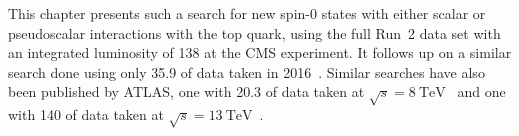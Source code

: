 



This chapter presents such a search for new spin-0 states with either scalar or pseudoscalar interactions with the top quark, using the full Run~2 data set with an integrated luminosity of \SI{138}{\fbinv} at the CMS experiment. It follows up on a similar search done using only \SI{35.9}{\fbinv} of data taken in 2016~\cite{CMS:HIG-17-027}. Similar searches have also been published by ATLAS, one with \SI{20.3}{\fbinv} of data taken at $\sqrt{s}=\SI{8}{\TeV}$~\cite{ATLAS:2017snw} and one with \SI{140}{\fbinv} of data taken at $\sqrt{s}=\SI{13}{\TeV}$~\cite{ATLAS:2024vxm}.

